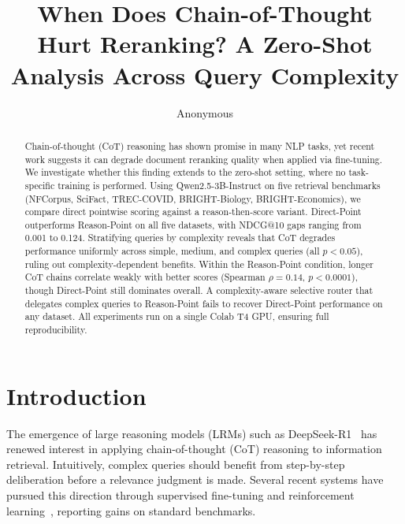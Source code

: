 \documentclass[sigconf,review]{acmart}
\begin{document}
\title{When Does Chain-of-Thought Hurt Reranking? A Zero-Shot Analysis Across Query Complexity}

\author{Anonymous}

\begin{abstract}
Chain-of-thought (CoT) reasoning has shown promise in many NLP tasks, yet recent work suggests it can degrade document reranking quality when applied via fine-tuning. We investigate whether this finding extends to the zero-shot setting, where no task-specific training is performed. Using Qwen2.5-3B-Instruct on five retrieval benchmarks (NFCorpus, SciFact, TREC-COVID, BRIGHT-Biology, BRIGHT-Economics), we compare direct pointwise scoring against a reason-then-score variant. Direct-Point outperforms Reason-Point on all five datasets, with NDCG@10 gaps ranging from 0.001 to 0.124. Stratifying queries by complexity reveals that CoT degrades performance uniformly across simple, medium, and complex queries (all $p<0.05$), ruling out complexity-dependent benefits. Within the Reason-Point condition, longer CoT chains correlate weakly with better scores (Spearman $\rho=0.14$, $p<0.0001$), though Direct-Point still dominates overall. A complexity-aware selective router that delegates complex queries to Reason-Point fails to recover Direct-Point performance on any dataset. All experiments run on a single Colab T4 GPU, ensuring full reproducibility.
\end{abstract}

\maketitle

\section{Introduction}

The emergence of large reasoning models (LRMs) such as DeepSeek-R1~\cite{guo2025deepseekr1} has renewed interest in applying chain-of-thought (CoT) reasoning to information retrieval. Intuitively, complex queries should benefit from step-by-step deliberation before a relevance judgment is made. Several recent systems have pursued this direction through supervised fine-tuning and reinforcement learning~\cite{weller2025rank1, zhuang2025rankr1, liu2025reasonrank, zhang2025rearank}, reporting gains on standard benchmarks.
\end{document}
